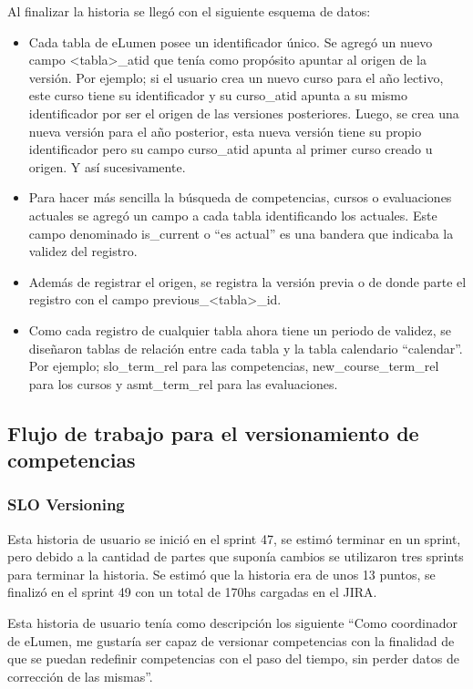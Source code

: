Al finalizar la historia se llegó con el siguiente esquema de datos:
\begin{itemize}
	\item Cada tabla de eLumen posee un identificador único. Se agregó un nuevo campo <tabla>_atid que tenía como propósito apuntar al origen de la versión. Por ejemplo; si el usuario crea un nuevo curso para el año lectivo, este curso tiene su identificador y su curso_atid apunta a su mismo identificador por ser el origen de las versiones posteriores. Luego, se crea una nueva versión para el año posterior, esta nueva versión tiene su propio identificador pero su campo curso_atid apunta al primer curso creado u origen. Y así sucesivamente.
	\item Para hacer más sencilla la búsqueda de competencias, cursos o evaluaciones actuales se agregó un campo a cada tabla identificando los actuales. Este campo denominado is_current o “es actual” es una bandera que indicaba la validez del registro.
	\item Además de registrar el origen, se registra la versión previa o de donde parte el registro con el campo previous_<tabla>_id.
	\item Como cada registro de cualquier tabla ahora tiene un periodo de validez, se diseñaron tablas de relación entre cada tabla y la tabla calendario “calendar”. Por ejemplo; slo_term_rel para las competencias, new_course_term_rel para los cursos y asmt_term_rel para las evaluaciones.
\end{itemize}

\subsection{Flujo de trabajo para el versionamiento de competencias}

\subsubsection{SLO Versioning}
Esta historia de usuario se inició en el sprint 47, se estimó terminar en un sprint, pero debido a la cantidad de partes que suponía cambios se utilizaron tres sprints para terminar la historia. Se estimó que la historia era de unos 13 puntos, se finalizó en el sprint 49 con un total de 170hs cargadas en el JIRA.

Esta historia de usuario tenía como descripción los siguiente “Como coordinador de eLumen, me gustaría ser capaz de versionar competencias con la finalidad de que se puedan redefinir competencias con el paso del tiempo, sin perder datos de corrección de las mismas”.

